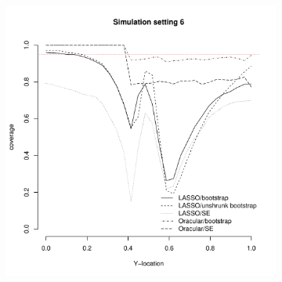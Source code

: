 \documentclass[authoryear, review, 11pt]{elsarticle}
\begin{document}
\begin{figure}
\begin{subfigure}[b]{0.3\textwidth}
			\label{fig:tiger}
		\end{subfigure}
        ~ %
		\begin{subfigure}[b]{0.3\textwidth}
			\centering
			\includegraphics[width=\textwidth]{../../figures/simulation/28-6-profile-coverage.pdf}
			\label{fig:mouse}
		\end{subfigure}
	\end{figure}
	
\end{document}
